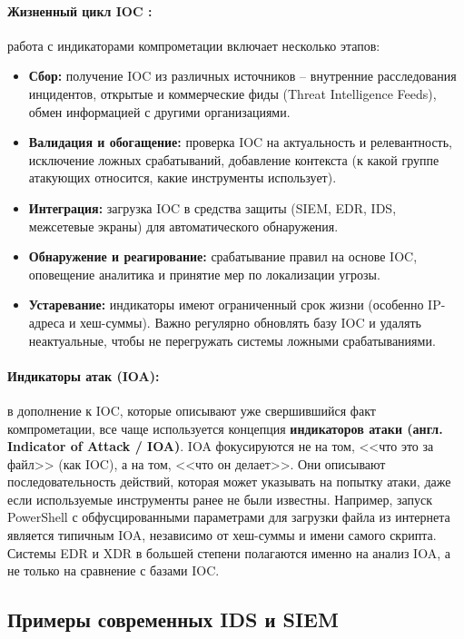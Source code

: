 \paragraph*{Жизненный цикл IOC \cite{IDSBranitsky}:} работа с индикаторами компрометации включает несколько этапов:
\begin{itemize}
    \item \textbf{Сбор:} получение IOC из различных источников -- внутренние расследования инцидентов, открытые и коммерческие фиды (Threat Intelligence Feeds), обмен информацией с другими организациями.
    \item \textbf{Валидация и обогащение:} проверка IOC на актуальность и релевантность, исключение ложных срабатываний, добавление контекста (к какой группе атакующих относится, какие инструменты использует).
    \item \textbf{Интеграция:} загрузка IOC в средства защиты (SIEM, EDR, IDS, межсетевые экраны) для автоматического обнаружения.
    \item \textbf{Обнаружение и реагирование:} срабатывание правил на основе IOC, оповещение аналитика и принятие мер по локализации угрозы.
    \item \textbf{Устаревание:} индикаторы имеют ограниченный срок жизни (особенно IP-адреса и хеш-суммы). Важно регулярно обновлять базу IOC и удалять неактуальные, чтобы не перегружать системы ложными срабатываниями.
\end{itemize}

\paragraph*{Индикаторы атак (IOA):} в дополнение к IOC, которые описывают уже свершившийся факт компрометации, все чаще используется концепция \textbf{индикаторов атаки (англ. Indicator of Attack / IOA)}. IOA фокусируются не на том, <<что это за файл>> (как IOC), а на том, <<что он делает>>. Они описывают последовательность действий, которая может указывать на попытку атаки, даже если используемые инструменты ранее не были известны. Например, запуск PowerShell с обфусцированными параметрами для загрузки файла из интернета является типичным IOA, независимо от хеш-суммы и имени самого скрипта. Системы EDR и XDR в большей степени полагаются именно на анализ IOA, а не только на сравнение с базами IOC.

\subsection{Примеры современных IDS и SIEM}

